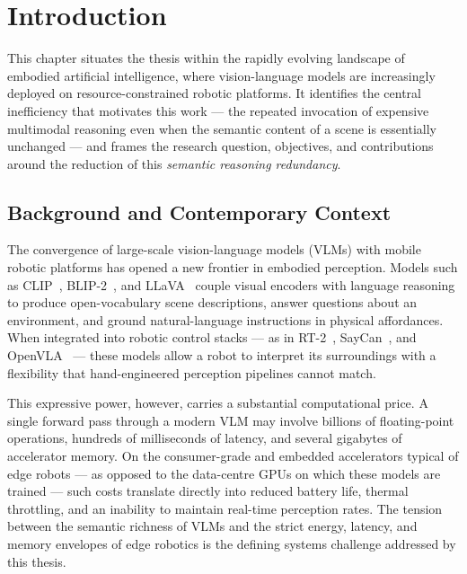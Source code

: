 \chapter{Introduction}
\label{ch:introduction}

\begin{chapterabstract}
This chapter situates the thesis within the rapidly evolving landscape of
embodied artificial intelligence, where vision-language models are
increasingly deployed on resource-constrained robotic platforms. It
identifies the central inefficiency that motivates this work --- the
repeated invocation of expensive multimodal reasoning even when the
semantic content of a scene is essentially unchanged --- and frames the
research question, objectives, and contributions around the reduction of
this \emph{semantic reasoning redundancy}.
\end{chapterabstract}

\section{Background and Contemporary Context}
\label{sec:intro-background}

The convergence of large-scale vision-language models (VLMs) with mobile
robotic platforms has opened a new frontier in embodied perception. Models
such as CLIP~\cite{Radford2021CLIP}, BLIP-2~\cite{Li2023BLIP2}, and
LLaVA~\cite{Liu2023LLaVA} couple visual encoders with language reasoning to
produce open-vocabulary scene descriptions, answer questions about an
environment, and ground natural-language instructions in physical
affordances. When integrated into robotic control stacks --- as in
RT-2~\cite{Brohan2023RT2}, SayCan~\cite{Ahn2022SayCan}, and
OpenVLA~\cite{Kim2024OpenVLA} --- these models allow a robot to interpret its
surroundings with a flexibility that hand-engineered perception pipelines
cannot match.

This expressive power, however, carries a substantial computational price.
A single forward pass through a modern VLM may involve billions of
floating-point operations, hundreds of milliseconds of latency, and several
gigabytes of accelerator memory. On the consumer-grade and embedded
accelerators typical of edge robots --- as opposed to the data-centre GPUs on
which these models are trained --- such costs translate directly into reduced
battery life, thermal throttling, and an inability to maintain real-time
perception rates. The tension between the semantic richness of VLMs and the
strict energy, latency, and memory envelopes of edge robotics is the
defining systems challenge addressed by this thesis.

